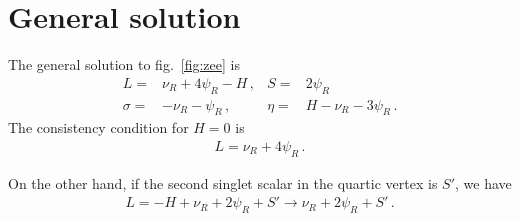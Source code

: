 \documentclass[12pt]{article}
\begin{document}
\appendix

\section{General solution}

The general solution to fig.~\ref{fig:zee} is
\begin{align}
  L=&\nu_R+4\psi_R -H \,,& S=& 2\psi_R \nonumber\\
  \sigma=& -\nu_R-\psi_R\,,& \eta=& H-\nu_R-3\psi_R\,.
\end{align}
The consistency condition for $H=0$ is
\begin{align}
  L=\nu_R+4\psi_R\,.
\end{align}

On the other hand, if the second singlet scalar in the quartic vertex is $S'$, we have
\begin{align}
  L=-H+\nu_R+2\psi_R+S'\to \nu_R+2\psi_R+S'\,.
\end{align}



%
%
%

%

\end{document}
